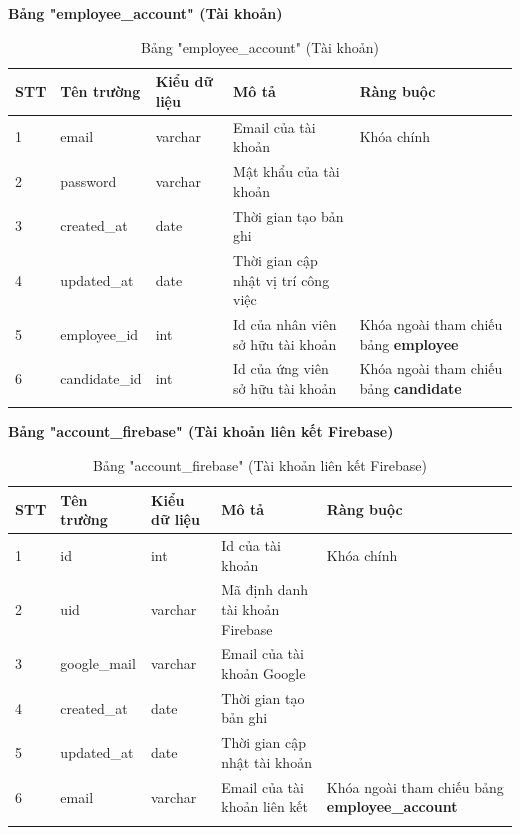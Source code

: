 \documentclass[../DoAn.tex]{subfiles}
\begin{document}
\textbf{Bảng "employee\_account" (Tài khoản)}
\begin{longtable}{|p{}|p{}|p{}|p{}|p{}|}
\hline
\textbf{STT} & \textbf{Tên trường} & \textbf{Kiểu dữ liệu} & \textbf{Mô tả } & \textbf{Ràng buộc} \\ \hline
1   & email & varchar & Email của tài khoản & Khóa chính \\ \hline
2   & password & varchar & Mật khẩu của tài khoản & \\ \hline
3   & created\_at & date & Thời gian tạo bản ghi & \\ \hline
4   & updated\_at & date & Thời gian cập nhật vị trí công việc & \\ \hline
5   & employee\_id & int & Id của nhân viên sở hữu tài khoản & Khóa ngoài tham chiếu bảng \textbf{employee} \\ \hline
6   & candidate\_id & int & Id của ứng viên sở hữu tài khoản & Khóa ngoài tham chiếu bảng \textbf{candidate} \\ \hline
\caption{Bảng "employee\_account" (Tài khoản)}
\end{longtable}

\textbf{Bảng "account\_firebase" (Tài khoản liên kết Firebase)}
\begin{longtable}{|p{}|p{}|p{}|p{}|p{}|}
\hline
\textbf{STT} & \textbf{Tên trường} & \textbf{Kiểu dữ liệu} & \textbf{Mô tả } & \textbf{Ràng buộc} \\ \hline
1   & id & int & Id của tài khoản & Khóa chính \\ \hline
2   & uid & varchar & Mã định danh tài khoản Firebase & \\ \hline
3   & google\_mail & varchar & Email của tài khoản Google & \\ \hline
4   & created\_at & date & Thời gian tạo bản ghi & \\ \hline
5   & updated\_at & date & Thời gian cập nhật tài khoản & \\ \hline
6   & email & varchar & Email của tài khoản liên kết & Khóa ngoài tham chiếu bảng 
\textbf{employee\_account} \\ \hline
\caption{Bảng "account\_firebase" (Tài khoản liên kết Firebase)}
\end{longtable}
\end{document}
